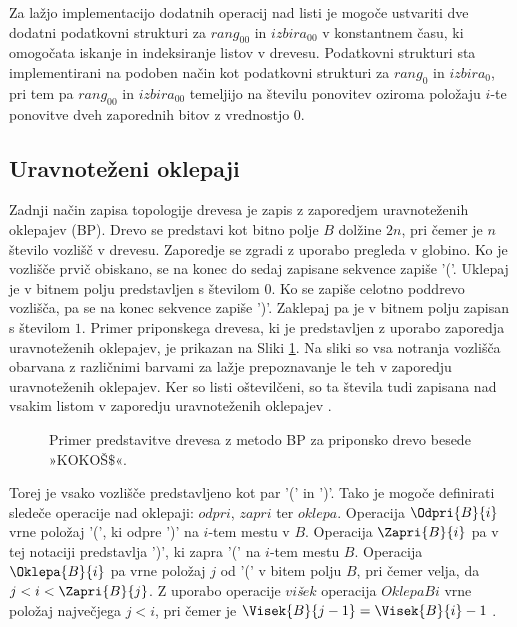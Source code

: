 Za lažjo implementacijo dodatnih operacij nad listi je mogoče ustvariti dve dodatni podatkovni strukturi za $rang_{00}$ in $izbira_{00}$ v konstantnem času, ki omogočata iskanje in indeksiranje listov v drevesu. Podatkovni strukturi sta implementirani na podoben način kot podatkovni strukturi za $rang_0$ in $izbira_0$, pri tem pa $rang_{00}$ in $izbira_{00}$ temeljijo na številu ponovitev oziroma položaju $i$-te ponovitve dveh zaporednih bitov z vrednostjo 0.

\subsection{Uravnoteženi oklepaji}\label{sec:oklepaji}

Zadnji način zapisa topologije drevesa je zapis z zaporedjem uravnoteženih oklepajev (BP). Drevo se predstavi kot bitno polje $B$ dolžine $2n$, pri čemer je $n$ število vozlišč v drevesu. Zaporedje se zgradi z uporabo pregleda v globino. Ko je vozlišče prvič obiskano, se na konec do sedaj zapisane sekvence zapiše '('. Uklepaj je v bitnem polju predstavljen s številom $0$. Ko se zapiše celotno poddrevo vozlišča, pa se na konec sekvence zapiše ')'. Zaklepaj pa je v bitnem polju zapisan s številom $1$. Primer priponskega drevesa, ki je predstavljen z uporabo zaporedja uravnoteženih oklepajev, je prikazan na Sliki \ref{fig:BP}. Na sliki so vsa notranja vozlišča obarvana z različnimi barvami za lažje prepoznavanje le teh v zaporedju uravnoteženih oklepajev. Ker so listi oštevilčeni, so ta števila tudi zapisana nad vsakim listom v zaporedju uravnoteženih oklepajev \cite{Navarro2016}.

\begin{figure}[htb]
    \begin{center}
        
        \caption{Primer predstavitve drevesa z metodo BP za priponsko drevo besede »KOKOŠ$\$$«.} 
        \label{fig:BP}
    \end{center}
\end{figure}

Torej je vsako vozlišče predstavljeno kot par '(' in ')'. Tako je mogoče definirati sledeče operacije nad oklepaji: $odpri$, $zapri$ ter $oklepa$. Operacija $\Odpri{B}{i}$ vrne položaj '(', ki odpre ')' na $i$-tem mestu v $B$. Operacija $\Zapri{B}{i}$ pa v tej notaciji predstavlja ')', ki zapra '(' na $i$-tem mestu $B$. Operacija $\Oklepa{B}{i}$ pa vrne položaj $j$ od '(' v bitem polju $B$, pri čemer velja, da $j<i<\Zapri{B}{j}$. Z uporabo operacije $vi$\textit{š}$ek$ operacija $Oklepa{B}{i}$ vrne položaj največjega $j<i$, pri čemer je $\Visek{B}{j-1}=\Visek{B}{i}-1$ \cite{Navarro2016}.

